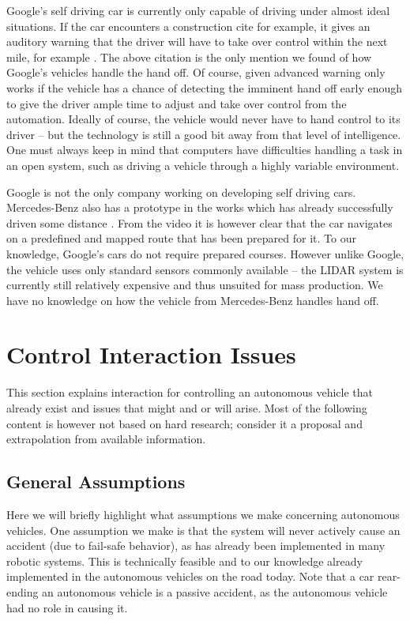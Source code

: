 \documentclass{acm_proc_article-sp}
\begin{document}
Google's self driving car is currently only capable of driving under almost ideal situations.
If the car encounters a construction cite for example, it gives an auditory warning that the driver will have to take over control within the next mile, for example \cite{www:newyorker_google_car}.
The above citation is the only mention we found of how Google's vehicles handle the hand off.
Of course, given advanced warning only works if the vehicle has a chance of detecting the imminent hand off early enough to give the driver ample time to adjust and take over control from the automation.
Ideally of course, the vehicle would never have to hand control to its driver – but the technology is still a good bit away from that level of intelligence.
One must always keep in mind that computers have difficulties handling a task in an open system, such as driving a vehicle through a highly variable environment.

Google is not the only company working on developing self driving cars.
Mercedes-Benz also has a prototype in the works which has already successfully driven some distance \cite{www:mercedes_autonomous}.
From the video it is however clear that the car navigates on a predefined and mapped route that has been prepared for it.
To our knowledge, Google's cars do not require prepared courses.
However unlike Google, the vehicle uses only standard sensors commonly available – the LIDAR system is currently still relatively expensive and thus unsuited for mass production.
We have no knowledge on how the vehicle from Mercedes-Benz handles hand off.

\section{Control Interaction Issues}

This section explains interaction for controlling an autonomous vehicle that already exist and issues that might and or will arise.
Most of the following content is however not based on hard research; consider it a proposal and extrapolation from available information.

\subsection{General Assumptions}

Here we will briefly highlight what assumptions we make concerning autonomous vehicles.
One assumption we make is that the system will never actively cause an accident (due to fail-safe behavior), as has already been implemented in many robotic systems.
This is technically feasible and to our knowledge already implemented in the autonomous vehicles on the road today.
Note that a car rear-ending an autonomous vehicle is a passive accident, as the autonomous vehicle had no role in causing it.
\end{document}
